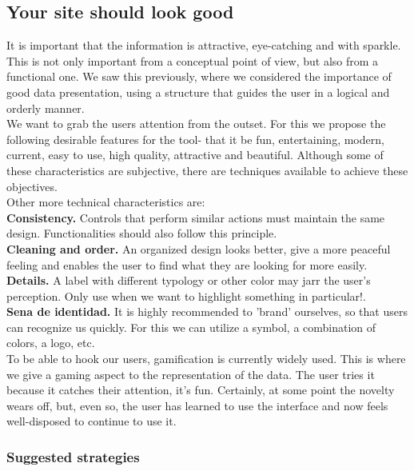 \subsection{Your site should look good}

It is important that the information is attractive, eye-catching and with sparkle. This is not only important from a conceptual point of view, but also from a functional one. We saw this previously, where we considered the importance
of good data presentation, using a structure that guides the user in a logical and orderly manner.\\

We want to grab the users attention from the outset. For this we propose the following desirable features for the tool- that it be fun, entertaining,
modern, current, easy to use, high quality, attractive and beautiful. Although some of these characteristics are subjective, there are techniques available to achieve these objectives.\\

Other more technical characteristics are: \\

\textbf{Consistency.} Controls that perform similar actions must maintain the same design. Functionalities
should also follow this principle. \\

\textbf{Cleaning and order.} An organized design looks better, give a more peaceful feeling and enables the user to find what they are looking for
more easily.\\

\textbf{Details.} A label with different typology or other color may jarr the user's perception. Only use when
we want to highlight something in particular!. \\

\textbf{Sena de identidad.} It is highly recommended to 'brand' ourselves, so that users can recognize us quickly. For this we can utilize a symbol, a combination of colors, a logo, etc.\\

To be able to hook our users, gamification is currently widely used. This is where we give a gaming aspect to the representation of the data. The user tries it because it catches their attention, it's fun.
Certainly, at some point the novelty wears off, but, even so, the user has learned to use the interface and now feels well-disposed to continue to use it.

\subsubsection*{Suggested strategies}

